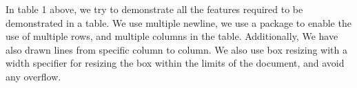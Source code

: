 \documentclass[12pt]{article}
\begin{document}
\begin{table}[H]
\small
\renewcommand{\arraystretch}{1.2}
\begin{center}
\end{center}
  \caption{\normalsize Table depicting the use of both multirow and multicolumn}
\end{table}%
{\Large In table 1 above, we try to demonstrate all the features required to be demonstrated in a table. We use multiple newline, we use a package to enable the use of multiple rows, and multiple columns in the table. Additionally, We have also drawn lines from specific column to column. We also use box resizing with a width specifier for resizing the box within the limits of the document, and avoid any overflow.}
\pagebreak
\end{document}

